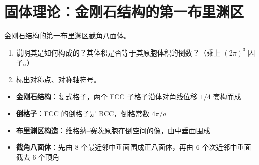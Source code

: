 \section{固体理论：金刚石结构的第一布里渊区}
\label{sec:diamond-brillouin-zone}

\begin{modelbox}
金刚石结构的第一布里渊区截角八面体。
\begin{enumerate}
    \item 说明其是如何构成的？其体积是否等于其原胞体积的倒数？（乘上 $(2\pi)^3$ 因子。）
    \item 标出对称点、对称轴符号。
\end{enumerate}
\end{modelbox}

\begin{tipbox}[考点快速分析]
\begin{itemize}
    \item \textbf{金刚石结构}：复式格子，两个 FCC 子格子沿体对角线位移 $1/4$ 套构而成
    \item \textbf{倒格子}：FCC 的倒格子是 BCC，倒格常数 $4\pi/a$
    \item \textbf{布里渊区构造}：维格纳--赛茨原胞在倒空间的像，由中垂面围成
    \item \textbf{截角八面体}：先由 8 个最近邻中垂面围成正八面体，再由 6 个次近邻中垂面截去 6 个顶角
\end{itemize}
\end{tipbox}

